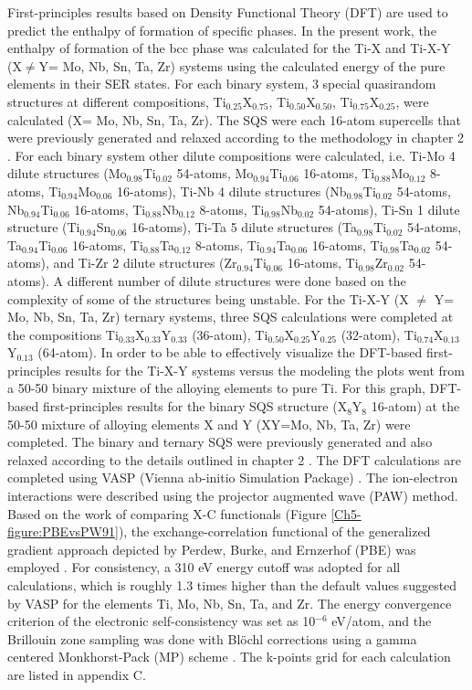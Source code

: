 First-principles results based on Density Functional Theory (DFT) are used to predict the enthalpy of formation of specific phases. In the present work, the enthalpy of formation of the bcc phase was calculated for the Ti-X and Ti-X-Y (X$\neq$Y= Mo, Nb, Sn, Ta, Zr) systems using the calculated energy of the pure elements in their SER states. For each binary system, 3 special quasirandom structures at different compositions, Ti$_{0.25}$X$_{0.75}$, Ti$_{0.50}$X$_{0.50}$, Ti$_{0.75}$X$_{0.25}$, were calculated (X= Mo, Nb, Sn, Ta, Zr). The SQS were each 16-atom supercells that were previously generated and relaxed according to the methodology in chapter 2 \cite{Jiang2004}. For each binary system other dilute compositions were calculated, i.e. Ti-Mo 4 dilute structures (Mo$_{0.98}$Ti$_{0.02}$ 54-atoms, Mo$_{0.94}$Ti$_{0.06}$ 16-atoms,  Ti$_{0.88}$Mo$_{0.12}$ 8-atoms, Ti$_{0.94}$Mo$_{0.06}$ 16-atoms), Ti-Nb 4 dilute structures (Nb$_{0.98}$Ti$_{0.02}$ 54-atoms, Nb$_{0.94}$Ti$_{0.06}$ 16-atoms, Ti$_{0.88}$Nb$_{0.12}$ 8-atoms, Ti$_{0.98}$Nb$_{0.02}$ 54-atoms), Ti-Sn 1 dilute structure (Ti$_{0.94}$Sn$_{0.06}$ 16-atoms), Ti-Ta 5 dilute structures (Ta$_{0.98}$Ti$_{0.02}$ 54-atoms, Ta$_{0.94}$Ti$_{0.06}$ 16-atoms, Ti$_{0.88}$Ta$_{0.12}$ 8-atoms, Ti$_{0.94}$Ta$_{0.06}$ 16-atoms, Ti$_{0.98}$Ta$_{0.02}$ 54-atoms), and Ti-Zr 2 dilute structures (Zr$_{0.94}$Ti$_{0.06}$ 16-atoms, Ti$_{0.98}$Zr$_{0.02}$ 54-atoms). A different number of dilute structures were done based on the complexity of some of the structures being unstable. For the Ti-X-Y (X $\neq$ Y= Mo, Nb, Sn, Ta, Zr) ternary systems, three SQS calculations were completed at the compositions Ti$_{0.33}$X$_{0.33}$Y$_{0.33}$ (36-atom), Ti$_{0.50}$X$_{0.25}$Y$_{0.25}$ (32-atom), Ti$_{0.74}$X$_{0.13}$Y$_{0.13}$ (64-atom). In order to be able to effectively visualize the DFT-based first-principles results for the Ti-X-Y systems versus the modeling the plots went from a 50-50 binary mixture of the alloying elements to pure Ti. For this graph, DFT-based first-principles results for the binary SQS structure (X$_{8}$Y$_{8}$ 16-atom) at the 50-50 mixture of alloying elements X and Y (XY=Mo, Nb, Ta, Zr) were completed. The binary and ternary SQS were previously generated and also relaxed according to the details outlined in chapter 2 \cite{Jiang2009,Jiang2004}. The DFT calculations are completed using VASP (Vienna ab-initio Simulation Package) \cite{Kresse1996}. The ion-electron interactions were described using the projector augmented wave (PAW) \cite{Kresse1999,Blochl1994} method. Based on the work of comparing X-C functionals (Figure \ref{Ch5-figure:PBEvsPW91}), the exchange-correlation functional of the generalized gradient approach depicted by Perdew, Burke, and Ernzerhof (PBE) was employed \cite{Perdew1996a}. For consistency, a 310 eV energy cutoff was adopted for all calculations, which is roughly 1.3 times higher than the default values suggested by VASP for the elements Ti, Mo, Nb, Sn, Ta, and Zr. The energy convergence criterion of the electronic self-consistency was set as 10$^{-6}$ eV/atom, and the Brillouin zone sampling was done with Bl\"ochl corrections \cite{Blochl1994} using a gamma centered Monkhorst-Pack (MP) scheme \cite{Kresse1996,Monkhorst1976a}. The k-points grid for each calculation are listed in appendix C.

